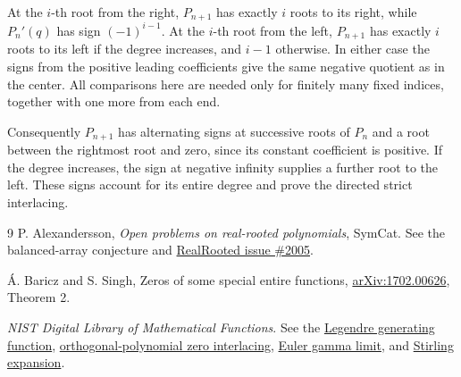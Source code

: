 \documentclass[11pt]{article}
\begin{document}
At the \(i\)-th root from the right, \(P_{n+1}\) has
exactly \(i\) roots to its right, while \(P_n'(q)\) has
sign \((-1)^{i-1}\).
At the \(i\)-th root from the left, \(P_{n+1}\) has
exactly \(i\) roots to its left if the degree increases,
and \(i-1\) otherwise. In either case the signs from
the positive leading coefficients give the same negative
quotient as in the center. All comparisons here are
needed only for finitely many fixed indices, together
with one more from each end.

Consequently \(P_{n+1}\) has alternating signs at
successive roots of \(P_n\) and a root between the
rightmost root and zero, since its constant coefficient
is positive. If the degree increases, the sign at negative
infinity supplies a further root to the left. These signs
account for its entire degree and prove the directed
strict interlacing.

\begin{thebibliography}{9}
P. Alexandersson, \emph{Open problems on real-rooted polynomials},
SymCat. See the balanced-array conjecture and
\href{https://github.com/PerAlexandersson/RealRooted/issues/2005}
{RealRooted issue \#2005}.

\'A. Baricz and S. Singh, Zeros of some special entire functions,
\href{https://arxiv.org/abs/1702.00626}{arXiv:1702.00626},
Theorem 2.

\emph{NIST Digital Library of Mathematical Functions}.
See the \href{https://dlmf.nist.gov/18.12.E11}{Legendre generating
function}, \href{https://dlmf.nist.gov/18.2.vi}{orthogonal-polynomial
zero interlacing}, \href{https://dlmf.nist.gov/5.8.E1}{Euler gamma limit},
and \href{https://dlmf.nist.gov/5.11.E1}{Stirling expansion}.
\end{thebibliography}
\end{document}
